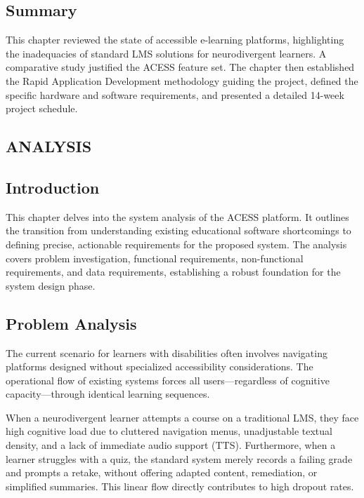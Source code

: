 \documentclass[12pt,a4paper]{report}
\begin{document}
\subsection{Summary}
This chapter reviewed the state of accessible e-learning platforms, highlighting the inadequacies of standard LMS solutions for neurodivergent learners. A comparative study justified the ACESS feature set. The chapter then established the Rapid Application Development methodology guiding the project, defined the specific hardware and software requirements, and presented a detailed 14-week project schedule.

\vfill \null
\newpage

\vfill \null
\thispagestyle{empty}
\begin{center}
\section{ANALYSIS}
\end{center}
\vspace{2cm}

\subsection{Introduction}
This chapter delves into the system analysis of the ACESS platform. It outlines the transition from understanding existing educational software shortcomings to defining precise, actionable requirements for the proposed system. The analysis covers problem investigation, functional requirements, non-functional requirements, and data requirements, establishing a robust foundation for the system design phase.

\subsection{Problem Analysis}
The current scenario for learners with disabilities often involves navigating platforms designed without specialized accessibility considerations. The operational flow of existing systems forces all users—regardless of cognitive capacity—through identical learning sequences. 

When a neurodivergent learner attempts a course on a traditional LMS, they face high cognitive load due to cluttered navigation menus, unadjustable textual density, and a lack of immediate audio support (TTS). Furthermore, when a learner struggles with a quiz, the standard system merely records a failing grade and prompts a retake, without offering adapted content, remediation, or simplified summaries. This linear flow directly contributes to high dropout rates.
\end{document}
